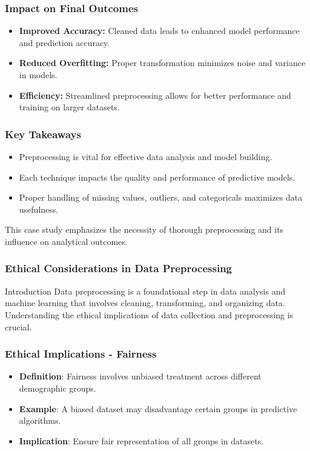 \documentclass[aspectratio=169]{beamer}
\begin{document}
\begin{frame}
    \frametitle{Impact on Final Outcomes}
    \begin{itemize}
        \item \textbf{Improved Accuracy:} Cleaned data leads to enhanced model performance and prediction accuracy.
        \item \textbf{Reduced Overfitting:} Proper transformation minimizes noise and variance in models.
        \item \textbf{Efficiency:} Streamlined preprocessing allows for better performance and training on larger datasets.
    \end{itemize}
\end{frame}

\begin{frame}
    \frametitle{Key Takeaways}
    \begin{itemize}
        \item Preprocessing is vital for effective data analysis and model building.
        \item Each technique impacts the quality and performance of predictive models.
        \item Proper handling of missing values, outliers, and categoricals maximizes data usefulness.
    \end{itemize}
    This case study emphasizes the necessity of thorough preprocessing and its influence on analytical outcomes.
\end{frame}

\begin{frame}[fragile]
    \frametitle{Ethical Considerations in Data Preprocessing}
    \begin{block}{Introduction}
        Data preprocessing is a foundational step in data analysis and machine learning that involves cleaning, transforming, and organizing data. Understanding the ethical implications of data collection and preprocessing is crucial.
    \end{block}
\end{frame}

\begin{frame}[fragile]
    \frametitle{Ethical Implications - Fairness}
    \begin{itemize}
        \item \textbf{Definition}: Fairness involves unbiased treatment across different demographic groups.
        \item \textbf{Example}: A biased dataset may disadvantage certain groups in predictive algorithms.
        \item \textbf{Implication}: Ensure fair representation of all groups in datasets.
    \end{itemize}
\end{frame}
\end{document}
